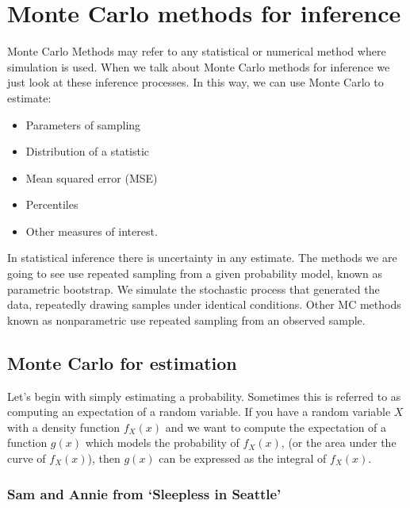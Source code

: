 \documentclass[
]{book}
\providecommand{\tightlist}{%
  \setlength{\itemsep}{0pt}\setlength{\parskip}{0pt}}
\theoremstyle{definition}
\theoremstyle{definition}
\theoremstyle{definition}
\theoremstyle{definition}
\theoremstyle{remark}
\begin{document}
\hypertarget{monte-carlo-methods-for-inference}{%
\chapter{Monte Carlo methods for inference}\label{monte-carlo-methods-for-inference}}

Monte Carlo Methods may refer to any statistical or numerical method where simulation is used. When we talk about Monte Carlo methods for inference we just look at these inference processes. In this way, we can use Monte Carlo to estimate:

\begin{itemize}
\tightlist
\item
  Parameters of sampling
\item
  Distribution of a statistic
\item
  Mean squared error (MSE)
\item
  Percentiles
\item
  Other measures of interest.
\end{itemize}

In statistical inference there is uncertainty in any estimate. The methods we are going to see use repeated sampling from a given probability model, known as parametric bootstrap. We simulate the stochastic process that generated the data, repeatedly drawing samples under identical conditions. Other MC methods known as nonparametric use repeated sampling from an observed sample.

\hypertarget{monte-carlo-for-estimation}{%
\section{Monte Carlo for estimation}\label{monte-carlo-for-estimation}}

Let's begin with simply estimating a probability. Sometimes this is referred to as computing an expectation of a random variable. If you have a random variable \(X\) with a density function \(f_X(x)\) and we want to compute the expectation of a function \(g(x)\) which models the probability of \(f_X(x)\), (or the area under the curve of \(f_X(x)\)), then \(g(x)\) can be expressed as the integral of \(f_X(x)\).

\hypertarget{sam-and-annie-from-sleepless-in-seattle}{%
\subsection{Sam and Annie from `Sleepless in Seattle'}\label{sam-and-annie-from-sleepless-in-seattle}}
\end{document}
